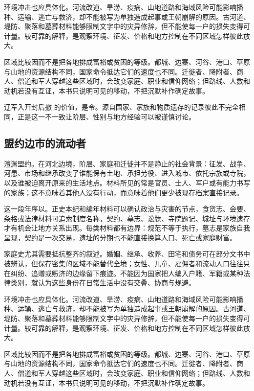 环境冲击也应具体化。河流改道、旱涝、疫病、山地道路和海域风险可能影响播种、运输、逃亡与救济，却不能被写为单独造成起事或王朝崩解的原因。古河道、堤防、聚落和墓葬材料能够限制文字中的灾异修辞，但不能使每一户的损失变得可计量。较可靠的解释，是观察环境、征发、价格和地方控制在不同区域怎样彼此放大。

区域比较因而不是把各地排成富裕或贫困的等级。都城、边寨、河谷、港口、草原与山地的资源结构不同，国家命令抵达它们的速度也不同。迁徙者、降附者、商人、僧道和军人穿越这些区域时，会改变家庭、职业和信仰网络；但路线、人数和动机若没有互证，本书只说明可见的移动，不把沉默补作确定故事。

辽军入开封后撤 的价值，是令。源自国家、家族和物质遗存的记录彼此不完全相同，正是这一不一致让阶层、性别与地方经验可以被谨慎讨论。

\subsection{盟约边市的流动者}

澶渊盟约。在河北边境，阶层、家庭和迁徙并不是静止的社会背景：征发、战争、河患、市场和继承改变了谁能保有土地、承担劳役、进入城市、依托宗族或寺院，以及谁被迫离开原来的生活地点。材料所见的常是官员、士人、军户或有能力书写的家族；这不意味着其他人没有行动，而意味着他们更少被现存档案直接记录。

这一段年序以。正史本纪和编年材料可以确认政治与灾害的节点，食货志、会要、条格或法律材料可追索制度名称，契约、墓志、讼牍、寺院题记、城址与环境遗存才有机会让地方关系出现。每类材料都有边界：规范不等于执行，墓志是家族自我呈现，契约是一次交易，遗址的分期也不能直接换算人口、死亡或家庭财富。

家庭史尤其需要抵抗整齐的叙述。婚姻、继承、收养、田宅和债务可在部分文书中被辨认，但保存密集的区域不能替代全境；女性、儿童、雇佣者和流动人口往往只在纠纷、追赠或赈济的边缘留下痕迹。不能因为国家把人编入户籍、军籍或某种法律类别，就认为这些身份在日常生活中没有交叠、协商与规避。

环境冲击也应具体化。河流改道、旱涝、疫病、山地道路和海域风险可能影响播种、运输、逃亡与救济，却不能被写为单独造成起事或王朝崩解的原因。古河道、堤防、聚落和墓葬材料能够限制文字中的灾异修辞，但不能使每一户的损失变得可计量。较可靠的解释，是观察环境、征发、价格和地方控制在不同区域怎样彼此放大。

区域比较因而不是把各地排成富裕或贫困的等级。都城、边寨、河谷、港口、草原与山地的资源结构不同，国家命令抵达它们的速度也不同。迁徙者、降附者、商人、僧道和军人穿越这些区域时，会改变家庭、职业和信仰网络；但路线、人数和动机若没有互证，本书只说明可见的移动，不把沉默补作确定故事。

